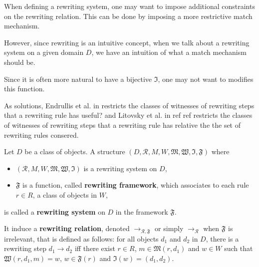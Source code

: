 When defining a rewriting system, one may want to impose additional constraints on the rewriting relation. This can be done by imposing a more restrictive match mechanism. 

However, since rewriting is an intuitive concept, when we talk about a rewriting system on a given domain $D$, we have an intuition of what a match mechanism should be. 

Since it is often more natural to have a bijective $\mathfrak{I}$, one may not want to modifies this function.

As solutions, Endrullis et al. in \cite{endrullis2024generalized}  restricts the classes of witnesses of rewriting steps that a rewriting rule has
useful?  and Litovsky et al. in  ref ref restricts the classes of witnesses of rewriting steps that a rewriting rule has relative the the set of rewriting rules consered.

\begin{definition}
  \label{def:rewriting_system_with_framework}
  Let $D$ be a class of objects. 
  A structure $(D, \mathcal{R},M,W,\mathfrak{M},\mathfrak{W},\mathfrak{I},\mathfrak{F})$ where 
  \begin{itemize}
    \item $(\mathcal{R},M,W,\mathfrak{M},\mathfrak{W},\mathfrak{I})$ is a rewriting system on $D$,
    \item $\mathfrak{F}$ is a function, called \textbf{rewriting framework},  which associates to each rule $r \mathop{\in} R$, 
       a class of objects in $W$,
  \end{itemize}
   is called a \textbf{rewriting system} on $D$ in the framework $\mathfrak{F}$.
   
   It induce a \textbf{rewriting relation}, denoted $\rightarrow_{\mathcal{R},\mathfrak{F}}$ or simply $\to_{\mathcal{R}}$ when $\mathfrak{F}$ is irrelevant, that is defined as follows: for all objects $d_1$ and $d_2$ in $D$, there is a rewriting step $d_1 \mathop{\rightarrow} d_2$ iff there exist $r \mathop{\in} R$, $m \mathop{\in} \mathfrak{M}(r,d_1)$ and $w \mathop{\in} W$ such that $\mathfrak{W}(r,d_1,m) \mathop{=} w$, $w \mathop{\in} \mathfrak{F}(r)$ and $\mathfrak{I}(w) \mathop{=} (d_1,d_2)$.
\end{definition}

